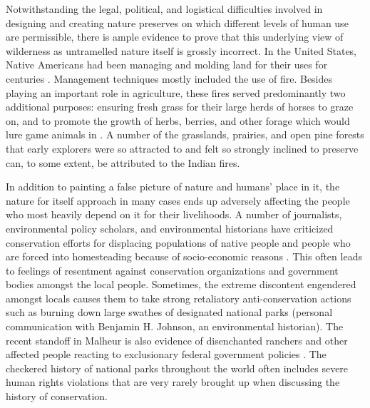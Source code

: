 \documentclass[rutwik_proposal.tex]{subfiles}
\begin{document}
Notwithstanding the legal, political, and logistical difficulties involved in designing and creating nature preserves on which different levels of human use are permissible, there is ample evidence to prove that this underlying view of wilderness as untramelled nature itself is grossly incorrect. In the United States, Native Americans had been managing and molding land for their uses for centuries \cite{Langston95, Steinberg13, Butzer99}. Management techniques mostly included the use of fire. Besides playing an important role in agriculture, these fires served predominantly two additional purposes: ensuring fresh grass for their large herds of horses to graze on, and to promote the growth of herbs, berries, and other forage which would lure game animals in \cite{Langston95, Pyne82}. A number of the grasslands, prairies, and open pine forests that early explorers were so attracted to and felt so strongly inclined to preserve can, to some extent, be attributed to the Indian fires.

In addition to painting a false picture of nature and humans' place in it, the nature for itself approach in many cases ends up adversely affecting the people who most heavily depend on it for their livelihoods. A number of journalists, environmental policy scholars, and environmental historians have criticized conservation efforts for displacing populations of native people and people who are forced into homesteading because of socio-economic reasons \cite{Agrawal09, Dowie06, Johnson99}. This often leads to feelings of resentment against conservation organizations and government bodies amongst the local people. Sometimes, the extreme discontent engendered amongst locals causes them to take strong retaliatory anti-conservation actions such as burning down large swathes of designated national parks (personal communication with Benjamin H. Johnson, an environmental historian). The recent standoff in Malheur is also evidence of disenchanted ranchers and other affected people reacting to exclusionary federal government policies \cite{Langston16}. The checkered history of national parks throughout the world often includes severe human rights violations that are very rarely brought up when discussing the history of conservation.
\end{document}
